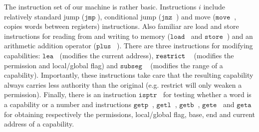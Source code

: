 \documentclass[compsoc,conference,letterpaper,fleqn]{IEEEtran}
\newcommand{\zinstr}[1]{\mathtt{#1}}
\newcommand{\oneinstr}[2]{\zinstr{#1} \; #2}
\newcommand{\jmp}[1]{\oneinstr{jmp}{#1}}
\newcommand{\twoinstr}[3]{\zinstr{#1} \; #2 \; #3}
\newcommand{\jnz}[2]{\twoinstr{jnz}{#1}{#2}}
\newcommand{\isptr}[2]{\twoinstr{isptr}{#1}{#2}}
\newcommand{\geta}[2]{\twoinstr{geta}{#1}{#2}}
\newcommand{\getb}[2]{\twoinstr{getb}{#1}{#2}}
\newcommand{\gete}[2]{\twoinstr{gete}{#1}{#2}}
\newcommand{\getp}[2]{\twoinstr{getp}{#1}{#2}}
\newcommand{\getl}[2]{\twoinstr{getl}{#1}{#2}}
\newcommand{\move}[2]{\twoinstr{move}{#1}{#2}}
\newcommand{\store}[2]{\twoinstr{store}{#1}{#2}}
\newcommand{\load}[2]{\twoinstr{load}{#1}{#2}}
\newcommand{\lea}[2]{\twoinstr{lea}{#1}{#2}}
\newcommand{\threeinstr}[4]{\zinstr{#1} \; #2 \; #3 \; #4}
\newcommand{\restrict}[3]{\threeinstr{restrict}{#1}{#2}{#3}}
\newcommand{\subseg}[3]{\threeinstr{subseg}{#1}{#2}{#3}}
\newcommand{\plus}[3]{\threeinstr{plus}{#1}{#2}{#3}}
\begin{document}
The instruction set of our machine is rather basic. Instructions $i$ include
relatively standard jump ($\jmp{}$), conditional jump ($\jnz{}{}$) and move
($\move{}{}$, copies words between registers) instructions. Also familiar are
load and store instructions for reading from and writing to memory ($\load{}{}$
and $\store{}{}$) and an arithmetic addition operator ($\plus{}{}{}$). There are
three instructions for modifying capabilities: $\lea{}{}$ (modifies the current
address), $\restrict{}{}$ (modifies the permission and local/global flag) and
$\subseg{}{}{}$ (modifies the range of a capability). Importantly, these
instructions take care that the resulting capability always carries less
authority than the original (e.g. restrict will only weaken a permission).
Finally, there is an instruction $\isptr{}{}$ for testing whether a word is a
capability or a number and instructions $\getp{}{}$, $\getl{}{}$, $\getb{}{}$,
$\gete{}{}$ and $\geta{}{}$ for obtaining respectively the permissions,
local/global flag, base, end and current address of a capability.
\end{document}
